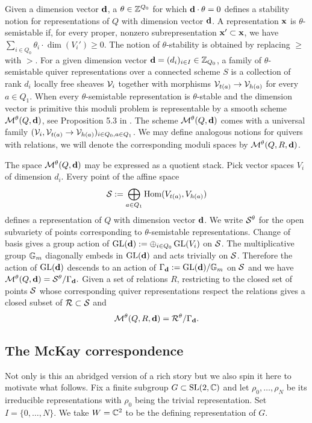\documentclass{amsart}
\theoremstyle{definition}
\begin{document}
Given a dimension vector $\mathbf{d}$, a $\theta \in \mathbb{Z}^{Q_0}$ for which $\mathbf{d} \cdot \theta=0$ defines a stability notion for representations of $Q$ with dimension vector $\mathbf{d}$.
A representation $\mathbf{x}$ is $\theta$-semistable if, for every proper, nonzero subrepresentation $\mathbf{x}' \subset \mathbf{x}$, we have $\sum_{i \in Q_0} \theta_i \cdot \dim(V_i') \geq 0$.  
The notion of $\theta$-stability is obtained by replacing $\geq$ with $>$. 
For a given dimension vector $\mathbf{d} =(d_i)_{i \in I} \in \mathbb{Z}_{Q_0}$, a family of $\theta$-semistable quiver representations over a connected scheme $S$ is a collection of rank $d_i$ locally free sheaves $\mathcal{V}_i$ together with morphisms $\mathcal{V}_{t(a)} \rightarrow \mathcal{V}_{h(a)}$ for every $a\in Q_1$. 
When every $\theta$-semistable representation is $\theta$-stable and the dimension vector is primitive this moduli problem is representable by a smooth scheme $\mathcal{M}^\theta(Q, \mathbf{d})$, see Proposition 5.3 in \cite{King}.
The scheme $\mathcal{M}^\theta(Q, \mathbf{d})$ comes with a universal family $(\mathcal{V}_i, \mathcal{V}_{t(a)} \rightarrow \mathcal{V}_{h(a)})_{i \in Q_0, a \in Q_1}$. 
We may define analogous notions for quivers with relations, we will denote the corresponding moduli spaces by $\mathcal{M}^\theta(Q,R,\mathbf{d})$.

The space $\mathcal{M}^\theta(Q, \mathbf{d})$ may be expressed as a quotient stack.
Pick vector spaces $V_i$ of dimension $d_i$.
Every point of the affine space
$$\mathcal{S}:= \bigoplus_{a \in Q_1} \operatorname{Hom}(V_{t(a)}, V_{h(a)})$$
defines a representation of $Q$ with dimension vector $\mathbf{d}$.
We write $\mathcal{S}^\theta$ for the open subvariety of points corresponding to $\theta$-semistable representations.
Change of basis gives a group action of $\operatorname{GL}(\mathbf{d}):= \oplus_{i \in Q_0} \operatorname{GL}(V_i)$ on $\mathcal{S}$.
The multiplicative group $\mathbb{G}_m$ diagonally embeds in $\operatorname{GL}(\mathbf{d})$ and acts trivially on $\mathcal{S}$.
Therefore the action of $\operatorname{GL}(\mathbf{d})$ descends to an action of $\Gamma_{\mathbf{d}}:= \operatorname{GL}(\mathbf{d})/\mathbb{G}_m$ on $\mathcal{S}$ and we have $\mathcal{M}^\theta(Q, \mathbf{d}) = \mathcal{S}^\theta / \Gamma_{\mathbf{d}}.$
Given a set of relations $R$, restricting to the closed set of points $\mathcal{S}$ whose corresponding quiver representations respect the relations gives a closed subset of $\mathcal{R} \subset \mathcal{S}$ and $$\mathcal{M}^\theta(Q,R,\mathbf{d})= \mathcal{R}^\theta/\Gamma_{\mathbf{d}}.$$

\subsection{The McKay correspondence}\label{ssc:McKay}
Not only is this an abridged version of a rich story but we also spin it here to motivate what follows.
Fix a finite subgroup $G \subset \operatorname{SL}(2,\mathbb{C})$ and let $\rho_0, \ldots, \rho_N$ be its
irreducible representations with $\rho_0$ being the trivial representation.
Set $I=\{0,\ldots,N\}$.
We take $W=\mathbb{C}^2$ to be the defining representation of $G$.
\end{document}
